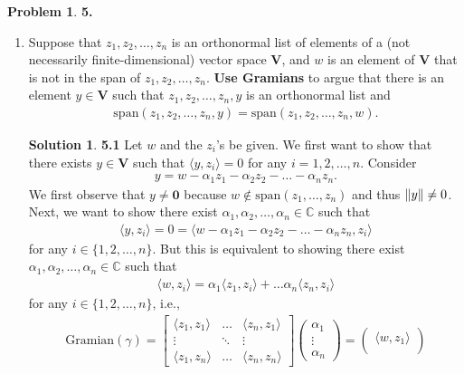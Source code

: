\documentclass{book}
\theoremstyle{definition}
\newtheorem*{prob*}{Problem}
\newtheorem*{sln*}{Solution}
\newcommand{\V}{\mathbf{V}}
\newcommand{\xpan}{\text{span}}
\newcommand{\la}{\langle}
\newcommand{\ra}{\rangle}
\begin{document}
\begin{prob*}\textbf{5.}
	\begin{enumerate}
		\item Suppose that $z_1, z_2, \dots, z_n$ is an orthonormal list of elements of a (not necessarily finite-dimensional) vector space $\V$, and $w$ is an element of $\V$ that is not in the span of $z_1,z_2,\dots,z_n$. \textbf{Use Gramians} to argue that there is an element $y\in \V$ such that $z_1, z_2,\dots,z_n, y$ is an orthonormal list and
		\begin{align*}
		\xpan(z_1,z_2,\dots,z_n,y) = \xpan(z_1,z_2,\dots,z_n,w).
		\end{align*}
		
		
		\begin{sln*}\textbf{5.1}
			Let $w$ and the $z_i$'s be given. We first want to show that there exists $y\in \V$ such that $\la y,z_i\ra = 0$ for any $i=1,2,\dots,n$. Consider
			\begin{align*}
			y = w - \alpha_1 z_1 - \alpha_2 z_2 - \dots - \alpha_n z_n.
			\end{align*}
			We first observe that $y \neq \mathbf{0}$ because $w \notin \xpan(z_1,\dots,z_n)$ and thus $\norm{y} \neq 0$. Next, we want to show there exist $\alpha_1,\alpha_2,\dots,\alpha_n \in \mathbb{C}$ such that
			\begin{align*}
			\la y ,z_i \ra = 0 = \la w - \alpha_1 z_1 - \alpha_2 z_2 - \dots - \alpha_n z_n, z_i \ra
			\end{align*}
			for any $i \in \{1,2,\dots,n\}$. But this is equivalent to showing there exist $\alpha_1,\alpha_2,\dots,\alpha_n \in \mathbb{C}$ such that
			\begin{align*}
			\la w ,z_i \ra = \alpha_1\la z_1,z_i \ra + \dots \alpha_n\la z_n,z_i \ra
			\end{align*}
			for any $i \in \{1,2,\dots,n \}$, i.e., 
			\begin{align*}
			\text{Gramian}(\gamma) = 
			\begin{bmatrix}
			\la z_1 , z_1 \ra & \dots & \la z_n,z_1 \ra\\
			\vdots & \ddots&\vdots\\
			\la z_1, z_n \ra & \dots & \la z_n,z_n \ra
			\end{bmatrix}\begin{pmatrix}
			\alpha_1 \\ \vdots \\ \alpha_n
			\end{pmatrix} = \begin{pmatrix}
			\la w,z_1 \ra\\

\end{pmatrix}
\end{align*}
\end{sln*}
\end{enumerate}
\end{prob*}
\end{document}
